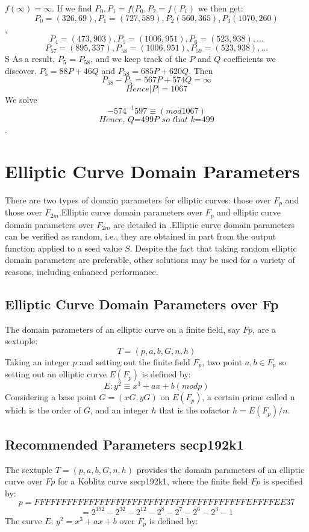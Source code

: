 $f(\infty)= \infty$. If we find $P_{0},P_{1}=f(P_{0},P_{2}=f(P_{1})$
we then get: 
$$P_{0}=(326,69),P_{1}=(727,589), P_{2}(560,365),P_{3}(1070,260)$$,
$$P_{4}=(473,903),P_{5}=(1006,951),P_{6}=(523,938), ...$$
$$P_{57}=(895,337),P_{58}=(1006,951),P_{59}=(523,938),...$$S
As a result, $P_{5}$ = $P_{58}$, and we keep track of the $P$ and $Q$ coefficients we discover.
$P_{5}=88P+46Q$  and $ P_{58}=685P+620Q$. Then
 $$P_{58}-P_{5}=567P + 574Q = \infty$$
$$Hence  |P|=1067$$
We solve 
$$-574^{-1}597 \equiv (mod 1067)$$
$$\textit{Hence, Q=499P so that k=499}$$.

\section{Elliptic Curve Domain Parameters}
There are two types of domain parameters for elliptic curves: those over $F_{p}$ and those over $F_{2m}$.Elliptic curve domain parameters over $F_{p}$ and elliptic curve domain parameters over $F_{2m}$ are detailed in \cite{brown2009standards} .Elliptic curve domain parameters can be verified as random, i.e., they are obtained in part from the output function applied to a seed value $S$. Despite the fact that taking random elliptic domain parameters are preferable, other solutions may be used for a variety of reasons, including enhanced performance.

\subsection{Elliptic Curve Domain Parameters over Fp}
The domain parameters of an elliptic curve on a finite field, say $F p$, are a sextuple:
$$T = (p, a, b, G, n, h)$$
Taking an integer $p$ and setting out the finite field $F_{p}$, two point $a,b \in F_{p}$ so setting out an elliptic curve $E(F_{p})$ is defined by:
$$E : y^{2} \equiv x^{3} + ax + b (mod p)$$
Considering a base point $G = (xG, yG)$ on $E(F_{p})$, a certain prime called n which is the order of $G$, and an integer $h$ that is
the cofactor $h = E(F_{p})/n$.
\subsection{Recommended Parameters secp192k1}
The sextuple $T = (p, a, b, G, n, h)$ provides the domain parameters of an elliptic curve over $F p$ for a Koblitz curve secp192k1, where the finite field $F p$ is specified by:
$$p = FFFFFFFF FFFFFFFF FFFFFFFF FFFFFFFF FFFFFFFE FFFFEE37$$
$$ = 2^{192}-2^{32}-2^{12}-2^{8}-2^{7}-2^{6}-2^{3}-1 $$
The curve $E$: $y^{2} = x^{3} + ax + b$ over $F_{p}$ is defined by:

